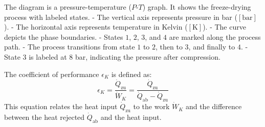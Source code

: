 The diagram is a pressure-temperature (\(P\)-\(T\)) graph. It shows the freeze-drying process with labeled states.  
- The vertical axis represents pressure in bar (\([ \text{bar} ]\)).  
- The horizontal axis represents temperature in Kelvin (\([ \text{K} ]\)).  
- The curve depicts the phase boundaries.  
- States \(1\), \(2\), \(3\), and \(4\) are marked along the process path.  
- The process transitions from state \(1\) to \(2\), then to \(3\), and finally to \(4\).  
- State \(3\) is labeled at 8 bar, indicating the pressure after compression.

The coefficient of performance \( \epsilon_K \) is defined as:  
\[
\epsilon_K = \frac{\dot{Q}_{\text{zu}}}{\dot{W}_K} = \frac{\dot{Q}_{\text{zu}}}{\dot{Q}_{\text{ab}} - \dot{Q}_{\text{zu}}}
\]  
This equation relates the heat input \( \dot{Q}_{\text{zu}} \) to the work \( \dot{W}_K \) and the difference between the heat rejected \( \dot{Q}_{\text{ab}} \) and the heat input.